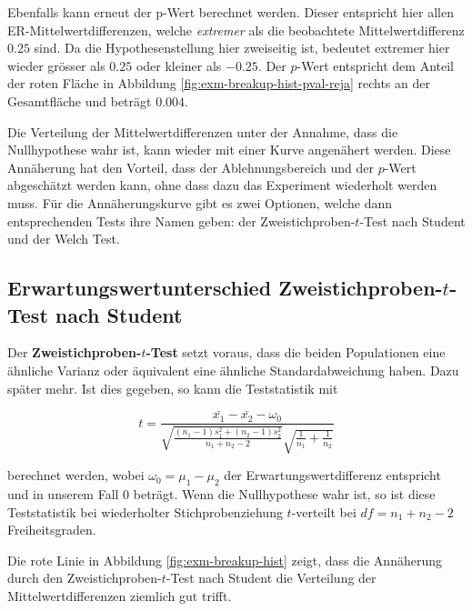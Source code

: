 \documentclass[
]{book}
\theoremstyle{definition}
\theoremstyle{definition}
\theoremstyle{definition}
\theoremstyle{definition}
\theoremstyle{remark}
\begin{document}
Ebenfalls kann erneut der p-Wert berechnet werden. Dieser entspricht hier allen ER-Mittelwertdifferenzen, welche \emph{extremer} als die beobachtete Mittelwertdifferenz \(0.25\) sind. Da die Hypothesenstellung hier zweiseitig ist, bedeutet extremer hier wieder grösser als \(0.25\) oder kleiner als \(-0.25\). Der \(p\)-Wert entspricht dem Anteil der roten Fläche in Abbildung \ref{fig:exm-breakup-hist-pval-reja} rechts an der Gesamtfläche und beträgt \(0.004\).

Die Verteilung der Mittelwertdifferenzen unter der Annahme, dass die Nullhypothese wahr ist, kann wieder mit einer Kurve angenähert werden. Diese Annäherung hat den Vorteil, dass der Ablehnungsbereich und der \(p\)-Wert abgeschätzt werden kann, ohne dass dazu das Experiment wiederholt werden muss. Für die Annäherungskurve gibt es zwei Optionen, welche dann entsprechenden Tests ihre Namen geben: der Zweistichproben-\(t\)-Test nach Student und der Welch Test.

\subsection{\texorpdfstring{Erwartungswertunterschied Zweistichproben-\(t\)-Test nach Student}{Erwartungswertunterschied Zweistichproben-t-Test nach Student}}\label{erwartungswertunterschied-zweistichproben-t-test-nach-student}

\label{customdef-twosample-t-test}{Der \textbf{Zweistichproben-\(t\)-Test} setzt voraus, dass die beiden Populationen eine ähnliche Varianz oder äquivalent eine ähnliche Standardabweichung haben.} Dazu später mehr. Ist dies gegeben, so kann die Teststatistik mit

\begin{equation}
t = \frac{\bar{x_1}-\bar{x_2} - \omega_0}{\sqrt{\frac{(n_1 - 1) s_1^2+(n_2-1)s_2^2}{n_1 + n_2 - 2}}\sqrt{\frac{1}{n_1}+\frac{1}{n_2}}}
\label{eq:t-emp-twosample-t}
\end{equation}

berechnet werden, wobei \(\omega_0 = \mu_1 - \mu_2\) der Erwartungswertdifferenz entspricht und in unserem Fall \(0\) beträgt. Wenn die Nullhypothese wahr ist, so ist diese Teststatistik bei wiederholter Stichprobenziehung \(t\)-verteilt bei \(df = n_1 + n_2 -2\) Freiheitsgraden.

Die rote Linie in Abbildung \ref{fig:exm-breakup-hist} zeigt, dass die Annäherung durch den Zweistichproben-\(t\)-Test nach Student die Verteilung der Mittelwertdifferenzen ziemlich gut trifft.
\end{document}

